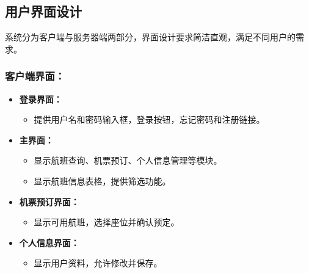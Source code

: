 \documentclass[UTF8, a4paper,12pt]{ctexart}
\begin{document}
\subsection{用户界面设计}
系统分为客户端与服务器端两部分，界面设计要求简洁直观，满足不同用户的需求。

\subsubsection{客户端界面：}
\begin{itemize}
    \item \textbf{登录界面：}
    \begin{itemize}
        \item 提供用户名和密码输入框，登录按钮，忘记密码和注册链接。
    \end{itemize}
    \item \textbf{主界面：}
    \begin{itemize}
        \item 显示航班查询、机票预订、个人信息管理等模块。
        \item 显示航班信息表格，提供筛选功能。
    \end{itemize}
    \item \textbf{机票预订界面：}
    \begin{itemize}
        \item 显示可用航班，选择座位并确认预定。
    \end{itemize}
    \item \textbf{个人信息界面：}
    \begin{itemize}
        \item 显示用户资料，允许修改并保存。
    \end{itemize}
\end{itemize}
\end{document}

